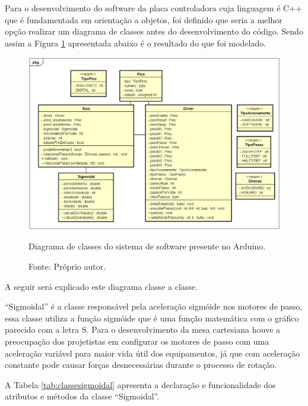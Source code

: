 Para o desenvolvimento do software da placa controladora cuja linguagem é C++ que é fundamentada em 
orientação a objetos, foi definido que seria a melhor opção realizar um diagrama de classes antes do 
desenvolvimento do código. Sendo assim a Figura \ref{fig:diagramaclasses} apresentada abaixo é 
o resultado do que foi modelado.

\begin{landscape}
\begin{figure}[H]
\centering
\includegraphics[scale = 0.65]{figuras/diagramaclasses}
\caption{Diagrama de classes do sistema de software presente no Arduino.}
\caption*{Fonte: Próprio autor.}
\label{fig:diagramaclasses}
\end{figure}
\end{landscape}

A seguir será explicado este diagrama classe a classe.

“Sigmoidal” é a classe responsável pela aceleração sigmóide nos motores de passo, essa classe utiliza 
a função sigmóide que é uma função matemática com o gráfico parecido com a letra S. Para o desenvolvimento 
da mesa cartesiana houve a preocupação dos projetistas em configurar os motores de passo com uma aceleração 
variável para maior vida útil dos equipamentos, já que com aceleração constante pode causar forças 
desnecessárias durante o processo de rotação.

A Tabela \ref{tab:classesigmoidal} apresenta a declaração e funcionalidade dos atributos e métodos 
da classe “Sigmoidal”.

